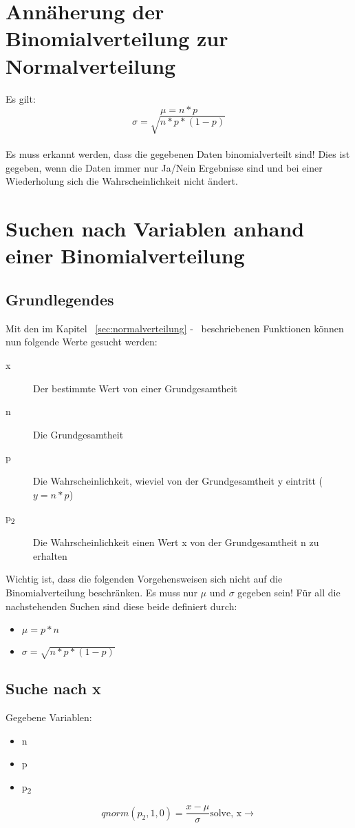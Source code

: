 \documentclass[a4paper,10pt]{article}
\begin{document}
\section{Annäherung der Binomialverteilung zur Normalverteilung}
Es gilt:
\begin{equation}
  \mu = n * p
\end{equation}
\begin{equation}
  \sigma = \sqrt{n * p * (1 - p)}
\end{equation}
\\
Es muss erkannt werden, dass die gegebenen Daten binomialverteilt
sind! Dies ist gegeben, wenn die Daten immer nur Ja/Nein Ergebnisse
sind und bei einer Wiederholung sich die Wahrscheinlichkeit nicht
ändert.
\section{Suchen nach Variablen anhand einer Binomialverteilung}
\subsection{Grundlegendes}
\label{sec:variabliensuchebinomialverteilunggrundlegendes}
Mit den im Kapitel ~\autoref{sec:normalverteilung}
-~ beschriebenen Funktionen können nun
folgende Werte gesucht werden:
\begin{description}
\item[x] Der bestimmte Wert von einer Grundgesamtheit
\item[n] Die Grundgesamtheit
\item[p] Die Wahrscheinlichkeit, wieviel von der Grundgesamtheit y
  eintritt ($ y = n * p $)
\item[p\textsubscript{2}] Die Wahrscheinlichkeit einen Wert x von der
  Grundgesamtheit n zu erhalten
\end{description}
Wichtig ist, dass die folgenden Vorgehensweisen sich nicht auf die
Binomialverteilung beschränken. Es muss nur $ \mu $ und $ \sigma $
gegeben sein! Für all die nachstehenden Suchen sind diese beide
definiert durch:
\begin{itemize}
\item $\mu = p * n $
\item $ \sigma = \sqrt{n * p * (1  - p)} $
\end{itemize}

\subsection{Suche nach x}
Gegebene Variablen:
\begin{itemize}
\item n
\item p
\item p\textsubscript{2}
\end{itemize}
\begin{equation}
  qnorm(p_2, 1, 0) = \frac{x -\mu}{\sigma} \text{solve, x} \rightarrow
\end{equation}
\end{document}
